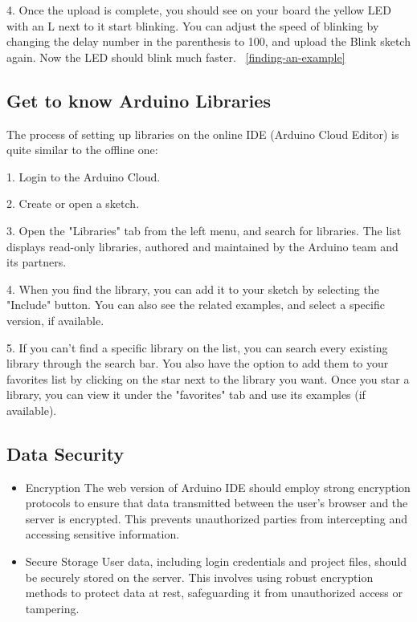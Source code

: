 4. Once the upload is complete, you should see on your board the yellow LED with an L next to it start blinking. You can adjust the speed of blinking by changing the delay number in the parenthesis to 100, and upload the Blink sketch again. Now the LED should blink much faster. ~\ref{finding-an-example}

\subsection{Get to know Arduino Libraries}
The process of setting up libraries on the online IDE (Arduino Cloud Editor) is quite similar to the offline one:

1. Login to the Arduino Cloud.

2. Create or open a sketch.

3. Open the "Libraries" tab from the left menu, and search for libraries. The list displays read-only libraries, authored and maintained by the Arduino team and its partners.

4. When you find the library, you can add it to your sketch by selecting the "Include" button. You can also see the related examples, and select a specific version, if available.

5. If you can't find a specific library on the list, you can search every existing library through the search bar. You also have the option to add them to your favorites list by clicking on the star next to the library you want. Once you star a library, you can view it under the "favorites" tab and use its examples (if available).

\subsection{Data Security}

\begin{itemize}
    \item{Encryption}
    The web version of Arduino IDE should employ strong encryption protocols to ensure that data transmitted between the user's browser and the server is encrypted. This prevents unauthorized parties from intercepting and accessing sensitive information.
    
    \item{Secure Storage}
    User data, including login credentials and project files, should be securely stored on the server. This involves using robust encryption methods to protect data at rest, safeguarding it from unauthorized access or tampering.
\end{itemize}

